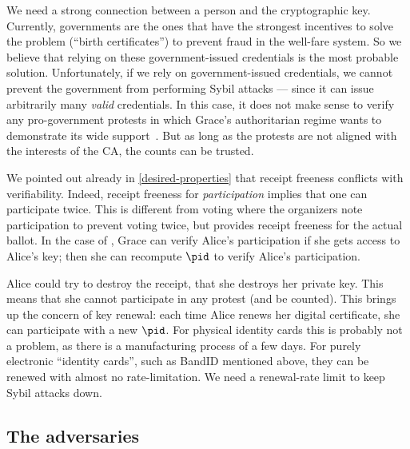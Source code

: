 We need a strong connection between a person and the cryptographic key.
Currently, governments are the ones that have the strongest incentives to solve 
the problem (\enquote{birth certificates}) to prevent \eg fraud in the 
well-fare system.
So we believe that relying on these government-issued credentials is the most 
probable solution.
Unfortunately, if we rely on government-issued credentials, we cannot prevent 
the government from performing Sybil attacks --- since it can issue arbitrarily 
many \emph{valid} credentials.
In this case, it does not make sense to verify any pro-government protests in 
which Grace's authoritarian regime wants to demonstrate its wide 
support~\cite{AlJazeeraOnVenezuela2017,VenezuelanStateWorkersCalledToParticipate}.
But as long as the protests are not aligned with the interests of the \ac{CA}, 
the counts can be trusted.

We pointed out already in \cref{desired-properties} that receipt freeness 
conflicts with verifiability.
Indeed, receipt freeness for \emph{participation} implies that one can 
participate twice.
This is different from voting where the organizers note participation to 
prevent voting twice, but provides receipt freeness for the actual ballot.
In the case of \CROCUS, Grace can verify Alice's participation if she gets 
access to Alice's key; then she can recompute \(\pid\) to verify Alice's 
participation.

Alice could try to destroy the receipt, \ie that she destroys her private key.
This means that she cannot participate in any protest (and be counted).
This brings up the concern of key renewal: each time Alice renews her digital 
certificate, she can participate with a new \(\pid\).
For physical identity cards this is probably not a problem, as there is a 
manufacturing process of a few days.
For purely electronic \enquote{identity cards}, such as BandID mentioned above, 
they can be renewed with almost no rate-limitation.
We need a renewal-rate limit to keep Sybil attacks down.

\subsection{The adversaries}

